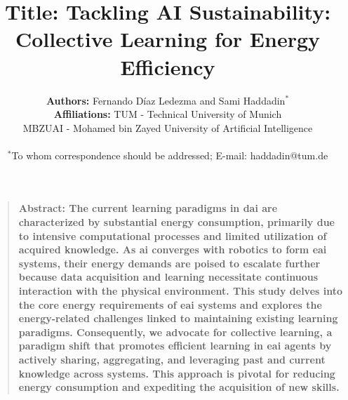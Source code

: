 \documentclass[12pt]{article}
\title{\textbf{Title:} Tackling AI Sustainability: Collective Learning for Energy Efficiency}
\author
{\textbf{Authors:} Fernando D\'iaz Ledezma and Sami Haddadin$^{\ast}$
	\\
	\normalsize{\textbf{Affiliations:} \normalsize{TUM - Technical University of Munich}}\\
	\normalsize{MBZUAI - Mohamed bin Zayed University of Artificial Intelligence}\\
	\\
	\normalsize{$^\ast$To whom correspondence should be addressed; E-mail: haddadin@tum.de}
}
\date{}
\newenvironment{sciabstract}{%
\begin{quote} \bf}
{\end{quote}}
\begin{document}
 

\baselineskip24pt


\maketitle 



\begin{sciabstract}
	\textbf{Abstract:} %
	The current learning paradigms in \ac{dai} are characterized by substantial energy consumption, primarily due to intensive computational processes and limited utilization of acquired knowledge. As \ac{ai} converges with robotics to form \ac{eai} systems, their energy demands are poised to escalate further because data acquisition and learning necessitate continuous interaction with the physical environment. This study delves into the core energy requirements of \ac{eai} systems and explores the energy-related challenges linked to maintaining existing learning paradigms. Consequently, we advocate for collective learning, a paradigm shift that promotes efficient learning in \ac{eai} agents by actively sharing, aggregating, and leveraging past and current knowledge across systems. This approach is pivotal for reducing energy consumption and expediting the acquisition of new skills.
\end{sciabstract}

\end{document}
